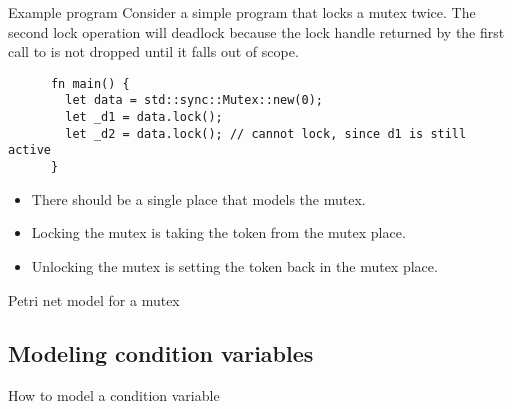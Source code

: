 \documentclass{beamer}
\begin{document}
\begin{frame}[fragile]{Example program}
  Consider a simple program that locks a mutex twice.
  The second lock operation will deadlock
  because the lock handle returned by the first call to 
  is not dropped until it falls out of scope.

  \vfill

  \begin{listing}
    \begin{verbatim}
      fn main() {
        let data = std::sync::Mutex::new(0);
        let _d1 = data.lock();
        let _d2 = data.lock(); // cannot lock, since d1 is still active
      }
    \end{verbatim}
  \end{listing}

  \vfill

  \begin{itemize}
    \item There should be a single place that models the mutex.
    \item Locking the mutex is taking the token from the mutex place.
    \item Unlocking the mutex is setting the token back in the mutex place.
  \end{itemize}
\end{frame}

\begin{frame}{Petri net model for a mutex}
  \begin{figure}
    \centering
    
  \end{figure}
\end{frame}

\subsection{Modeling condition variables}

\begin{frame}{How to model a condition variable}
  \begin{figure}
    \centering
    
  \end{figure}
\end{frame}
\end{document}
